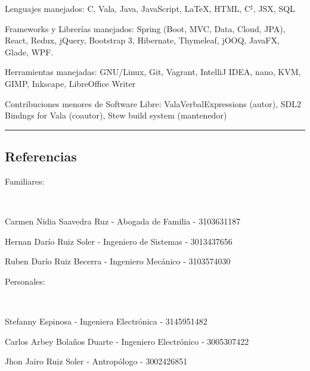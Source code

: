\documentclass[10pt,a4paper]{article}
\newenvironment{indentsection}[1]%
{\begin{list}{}%
	{\setlength{\leftmargin}{#1}}%
	\item[]%
}
{\end{list}}
\begin{document}
\begin{indentsection}{\parindent}
\begin{description*}
	\item[Lenguajes manejados:]
	C, Vala, Java, JavaScript, \LaTeX, HTML, C{$^\sharp$}, JSX, SQL
	\item[Frameworks y Librerías manejados:]
	Spring (Boot, MVC, Data, Cloud, JPA), React, Redux, jQuery, Bootstrap 3, Hibernate, Thymeleaf, jOOQ, JavaFX, Glade, WPF.
	\item[Herramientas manejadas:]
	GNU/Linux, Git, Vagrant, IntelliJ IDEA, nano, KVM, GIMP, Inkscape, LibreOffice Writer
	\item[Contribuciones menores de Software Libre:]
	ValaVerbalExpressions (autor), SDL2 Bindngs for Vala (coautor), Stew build system (mantenedor)
\end{description*}
\end{indentsection}
\hrule
\vspace{-0.4em}
\subsection*{Referencias}
\begin{indentsection}{\parindent}
\begin{description*}
	\item[Familiares:]
	
	\begin{itemize*}
		\
		\item
		\item Carmen Nidia Saavedra Ruz - Abogada de Familia - 3103631187
		\item Hernan Darío Ruiz Soler - Ingeniero de Sistemas - 3013437656
		\item Ruben Darío Ruiz Becerra - Ingeniero Mecánico - 3103574030
	\end{itemize*}

	\item[Personales:]
	
	\begin{itemize*}
		\
		\item
		\item Stefanny Espinosa - Ingeniera Electrónica -  3145951482
		\item Carlos Arbey Bolaños Duarte - Ingeniero Electrónico -  3005307422
		\item Jhon Jairo Ruiz Soler - Antropólogo - 3002426851
	\end{itemize*}
\end{description*}
\end{indentsection}
\end{document}
